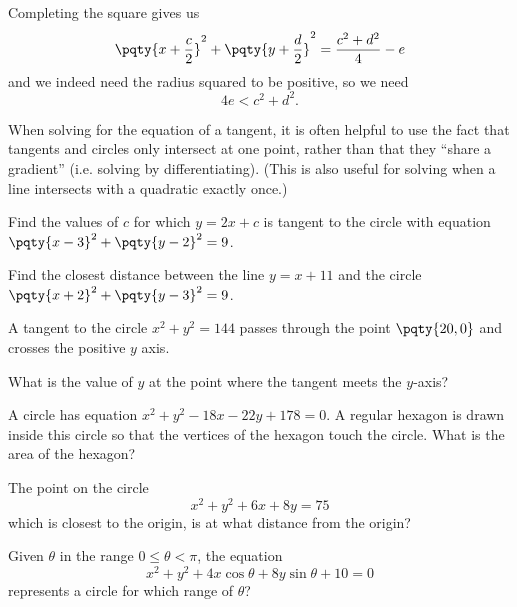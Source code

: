 \documentclass{article}
\begin{document}
Completing the square gives us
\[
    \pqty{x + \frac{c}{2}}^2 + \pqty{y + \frac{d}{2}}^2 = \frac{c^2 + d^2}{4} - e
\]
and we indeed need the radius squared to be positive, so we need
\[
    4e < c^2 + d^2.
\]

When solving for the equation of a tangent, it is often helpful to use the fact that tangents and circles only intersect at one point, rather than that they ``share a gradient'' (i.e. solving by differentiating). (This is also useful for solving when a line intersects with a quadratic exactly once.)

\begin{example}
    Find the values of \(c\) for which \(y = 2x + c\) is tangent to the circle with equation \(\pqty{x - 3}^2 + \pqty{y - 2}^2 = 9\).
\end{example}

\begin{example}
    Find the closest distance between the line \(y = x + 11\) and the circle \(\pqty{x + 2}^2 + \pqty{y - 3}^2 = 9\).
\end{example}

\begin{example}[TMUA 2017 P1 Q6]
    A tangent to the circle \(x^2 + y^2 = 144\) passes through the point \(\pqty{20, 0}\) and crosses the positive \(y\) axis.

    What is the value of \(y\) at the point where the tangent meets the \(y\)-axis?
\end{example}

\begin{example}[TMUA 2017 P1 Q9]
    A circle has equation \(x^2 + y^2 - 18 x - 22 y + 178 = 0\). A regular hexagon is drawn inside this circle so that the vertices of the hexagon touch the circle. What is the area of the hexagon?
\end{example}

\begin{example}
    The point on the circle
    \[
        x^2 + y^2 + 6x + 8y = 75
    \]
    which is closest to the origin, is at what distance from the origin?
\end{example}

\begin{example}
    Given \(\theta\) in the range \(0 \leq \theta < \pi\), the equation
    \[
        x^2 + y^2 + 4x \cos \theta + 8y \sin \theta + 10 = 0
    \]
    represents a circle for which range of \(\theta\)?
\end{example}
\end{document}
